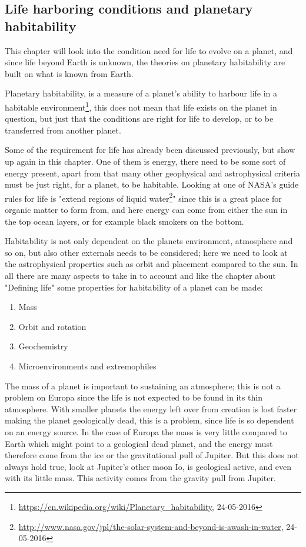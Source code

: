 \subsection{Life harboring conditions and planetary habitability}

This chapter will look into the condition need for life to evolve on a planet, and since life beyond Earth is unknown, the theories on planetary habitability are built on what is known from Earth.

Planetary habitability, is a measure of a planet's ability to harbour life in a habitable environment\footnote{\url{https://en.wikipedia.org/wiki/Planetary_habitability}, 24-05-2016}, this does not mean that life exists on the planet in question, but just that the conditions are right for life to develop, or to be transferred from another planet.

Some of the requirement for life has already been discussed previously, but show up again in this chapter. One of them is energy, there need to be some sort of energy present, apart from that many other geophysical and astrophysical criteria must be just right, for a planet, to be habitable. Looking at one of NASA's guide rules for life is "extend regions of liquid water\footnote{\url{http://www.nasa.gov/jpl/the-solar-system-and-beyond-is-awash-in-water}, 24-05-2016}"  since this is a great place for organic matter to form from, and here energy can come from either the sun in the top ocean layers, or for example black smokers on the bottom.

Habitability is not only dependent on the planets environment, atmosphere and so on, but also other externals needs to be considered; here we need to look at the astrophysical properties such as orbit and placement compared to the sun. In all there are many aspects to take in to account and like the chapter about "Defining life" some properties for habitability of a planet can be made:
\begin{enumerate}
  \item Mass
  \item Orbit and rotation
  \item Geochemistry
  \item Microenvironments and extremophiles
\end{enumerate}
The mass of a planet is important to sustaining an atmosphere; this is not a problem on Europa since the life is not expected to be found in its thin atmosphere. With smaller planets the energy left over from creation is lost faster making the planet geologically dead, this is a problem, since life is so dependent on an energy source. In the case of Europa the mass is very little compared to Earth which might point to a geological dead planet, and the energy must therefore come from the ice or the gravitational pull of Jupiter. But this does not always hold true, look at Jupiter's other moon Io, is geological active, and even with its little mass. This activity comes from the gravity pull from Jupiter.

